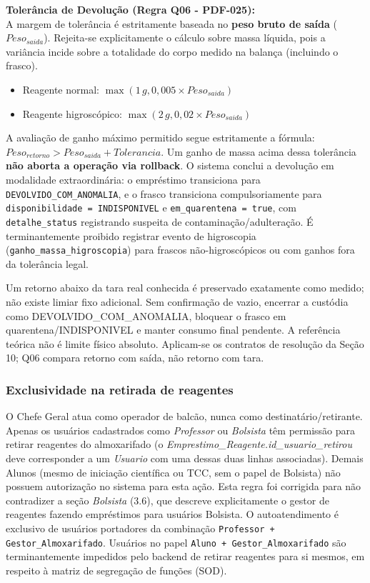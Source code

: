 \begin{regra}
\textbf{Tolerância de Devolução (Regra Q06 - PDF-025):}\\
A margem de tolerância é estritamente baseada no \textbf{peso bruto de saída} ($Peso_{saida}$). Rejeita-se explicitamente o cálculo sobre massa líquida, pois a variância incide sobre a totalidade do corpo medido na balança (incluindo o frasco).
\begin{itemize}
    \item Reagente normal: $\max(1\,g, 0{,}005 \times Peso_{saida})$
    \item Reagente higroscópico: $\max(2\,g, 0{,}02 \times Peso_{saida})$
\end{itemize}
A avaliação de ganho máximo permitido segue estritamente a fórmula: $Peso_{retorno} > Peso_{saida} + Tolerancia$. 
Um ganho de massa acima dessa tolerância \textbf{não aborta a operação via rollback}. O sistema conclui a devolução em modalidade extraordinária: o empréstimo transiciona para \texttt{DEVOLVIDO\_COM\_ANOMALIA}, e o frasco transiciona compulsoriamente para \texttt{disponibilidade = INDISPONIVEL} e \texttt{em\_quarentena = true}, com \texttt{detalhe\_status} registrando suspeita de contaminação/adulteração. É terminantemente proibido registrar evento de higroscopia (\texttt{ganho\_massa\_higroscopia}) para frascos não-higroscópicos ou com ganhos fora da tolerância legal.

Um retorno abaixo da tara real conhecida é preservado exatamente como medido; não existe limiar fixo adicional. Sem confirmação de vazio, encerrar a custódia como DEVOLVIDO\_COM\_ANOMALIA, bloquear o frasco em quarentena/INDISPONIVEL e manter consumo final pendente. A referência teórica não é limite físico absoluto. Aplicam-se os contratos de resolução da Seção 10; Q06 compara retorno com saída, não retorno com tara.
\end{regra}

\subsubsection{Exclusividade na retirada de reagentes}
\begin{regra}
O Chefe Geral atua como operador de balcão, nunca como destinatário/retirante. Apenas os usuários cadastrados como \textit{Professor} ou \textit{Bolsista} têm permissão para retirar reagentes do almoxarifado (o \textit{Emprestimo\_Reagente.id\_usuario\_retirou} deve corresponder a um \textit{Usuario} com uma dessas duas linhas associadas). Demais Alunos (mesmo de iniciação científica ou TCC, sem o papel de Bolsista) não possuem autorização no sistema para esta ação. Esta regra foi corrigida para não contradizer a seção \textit{Bolsista} (3.6), que descreve explicitamente o gestor de reagentes fazendo empréstimos para usuários Bolsista. O autoatendimento é exclusivo de usuários portadores da combinação \texttt{Professor + Gestor\_Almoxarifado}. Usuários no papel \texttt{Aluno + Gestor\_Almoxarifado} são terminantemente impedidos pelo backend de retirar reagentes para si mesmos, em respeito à matriz de segregação de funções (SOD).
\end{regra}


